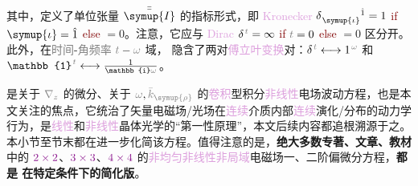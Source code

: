 其中，定义了单位张量 $\bar{\bar{\symup{I}}}$ 的指标形式，即 \textcolor{Plum}{Kronecker} $\delta^{\;\! \hphantom{\symup{\iota}} \hat{1}}_{\;\! \symup{\iota} \hphantom{z}} = 1$ \textcolor{Maroon}{if} $\symup{\iota} = \hat{1}$ \textcolor{Maroon}{else} $= 0$。注意，它应与 \textcolor{Plum}{Dirac} $\delta^{\;\! \mathcolor{gray}{t}} = \infty$ \textcolor{Maroon}{if} $\mathcolor{gray}{t} = 0$ \textcolor{Maroon}{else} $= 0$ 区分开。此外，在\textcolor{gray}{时间}-\textcolor{gray}{角频率} $\mathcolor{gray}{t} - \mathcolor{gray}{\omega}$ 域， 隐含了两对\textcolor{Plum}{傅立叶变换}对：$\delta^{\;\! \mathcolor{gray}{t}} \longleftrightarrow 1^{\;\! \mathcolor{gray}{\omega}}$ 和 $\mathbb{1}^{\;\! \mathcolor{gray}{t}} \longleftrightarrow \frac{1}{\mathbb{i} \mathcolor{gray}{\omega}}$。

 是关于 $\mathcolor{gray}{\nabla_z}$ 的微分、关于 $\mathcolor{gray}{\omega}, \mathcolor{gray}{\bar{k}_{\symup{\rho}}}$ 的\textcolor{Plum}{卷积}型积分\textcolor{Plum}{非线性}电场波动方程，也是本文关注的焦点，它统治了矢量电磁场/光场在\textcolor{Plum}{连续}介质内部\textcolor{Plum}{连续}演化/分布的动力学行为，是\textcolor{Plum}{线性}和\textcolor{Plum}{非线性}\textcolor{PineGreen}{晶体光学}的“\textcolor{NavyBlue}{第一性原理}”，本文后续内容都追根溯源于之。本小节至节末都在进一步化简该方程。值得注意的是，\textbf{绝大多数专著、文章、教材}中的 $\textcolor{Plum}{2 \times 2}$、$\textcolor{Plum}{3 \times 3}$、$\textcolor{Plum}{4 \times 4}$ 的\textcolor{Plum}{非均匀}\textcolor{Plum}{非线性}\textcolor{Plum}{非局域}电磁场一、二阶偏微分方程\cite{zhangRigorousModelingLaser2015,zhangFullyVectorialSimulation2016,stallingaBerreman4x4Matrix1999,borzdovWavesLinearQuadratic1996,changWavePropagationBianisotropic2014,sturmElectromagneticWavesCrystals2024,sturmElectromagneticWavesCrystals2024,mcleodVectorFourierOptics2014,berryOpticalSingularitiesBianisotropic2005,raabMultipoleTheoryElectromagnetism2004}，\textbf{都是  在特定条件下的简化版}。%

